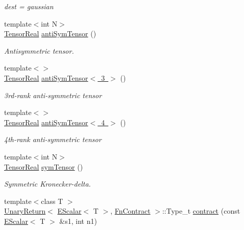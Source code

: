 \begin{DoxyCompactItemize}
\begin{DoxyCompactList}\small\item\em dest = gaussian \end{DoxyCompactList}\item 
{\footnotesize template$<$int N$>$ }\\\mbox{\hyperlink{group__defs_ga958dd8b23f0fe048624bd04c42201408}{Tensor\+Real}} \mbox{\hyperlink{namespaceENSEM_aee2482527c2e020e327d542d07e92dee}{anti\+Sym\+Tensor}} ()
\begin{DoxyCompactList}\small\item\em Antisymmetric tensor. \end{DoxyCompactList}\item 
{\footnotesize template$<$$>$ }\\\mbox{\hyperlink{group__defs_ga958dd8b23f0fe048624bd04c42201408}{Tensor\+Real}} \mbox{\hyperlink{namespaceENSEM_a4ce86ea9e03a33e62daa145e7832fa29}{anti\+Sym\+Tensor$<$ 3 $>$}} ()
\begin{DoxyCompactList}\small\item\em 3rd-\/rank anti-\/symmetric tensor \end{DoxyCompactList}\item 
{\footnotesize template$<$$>$ }\\\mbox{\hyperlink{group__defs_ga958dd8b23f0fe048624bd04c42201408}{Tensor\+Real}} \mbox{\hyperlink{namespaceENSEM_a6065b3f3c5f3e116256e3897ce3ca1d5}{anti\+Sym\+Tensor$<$ 4 $>$}} ()
\begin{DoxyCompactList}\small\item\em 4th-\/rank anti-\/symmetric tensor \end{DoxyCompactList}\item 
{\footnotesize template$<$int N$>$ }\\\mbox{\hyperlink{group__defs_ga958dd8b23f0fe048624bd04c42201408}{Tensor\+Real}} \mbox{\hyperlink{namespaceENSEM_a4b7b45dcc2e93e939b6662956efaf3d6}{sym\+Tensor}} ()
\begin{DoxyCompactList}\small\item\em Symmetric Kronecker-\/delta. \end{DoxyCompactList}\item 
{\footnotesize template$<$class T $>$ }\\\mbox{\hyperlink{structENSEM_1_1UnaryReturn}{Unary\+Return}}$<$ \mbox{\hyperlink{classENSEM_1_1EScalar}{E\+Scalar}}$<$ T $>$, \mbox{\hyperlink{structENSEM_1_1FnContract}{Fn\+Contract}} $>$\+::Type\+\_\+t \mbox{\hyperlink{namespaceENSEM_a8a53ef224c8fabaae4e9319588554b96}{contract}} (const \mbox{\hyperlink{classENSEM_1_1EScalar}{E\+Scalar}}$<$ T $>$ \&s1, int n1)

\end{DoxyCompactItemize}
